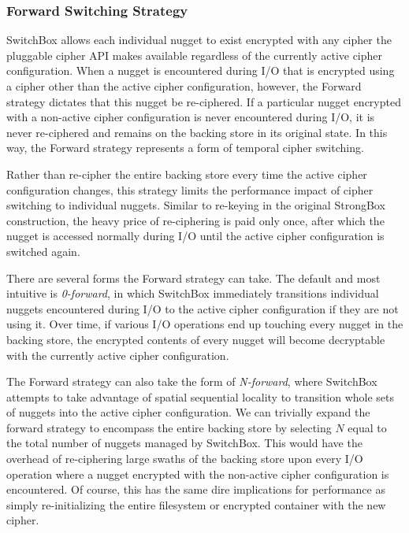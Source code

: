 \subsubsection{Forward Switching Strategy}

SwitchBox allows each individual nugget to exist encrypted with any cipher the
pluggable cipher API makes available regardless of the currently active cipher
configuration. When a nugget is encountered during I/O that is encrypted using a
cipher other than the active cipher configuration, however, the Forward strategy
dictates that this nugget be re-ciphered. If a particular nugget encrypted with
a non-active cipher configuration is never encountered during I/O, it is never
re-ciphered and remains on the backing store in its original state. In this way,
the Forward strategy represents a form of temporal cipher switching.

Rather than re-cipher the entire backing store every time the active cipher
configuration changes, this strategy limits the performance impact of cipher
switching to individual nuggets. Similar to re-keying in the original StrongBox
construction, the heavy price of re-ciphering is paid only once, after which the
nugget is accessed normally during I/O until the active cipher configuration is
switched again.

There are several forms the Forward strategy can take. The default and most
intuitive is \emph{0-forward}, in which SwitchBox immediately transitions
individual nuggets encountered during I/O to the active cipher configuration if
they are not using it. Over time, if various I/O operations end up touching
every nugget in the backing store, the encrypted contents of every nugget will
become decryptable with the currently active cipher configuration.

The Forward strategy can also take the form of \emph{N-forward}, where SwitchBox
attempts to take advantage of spatial sequential locality to transition whole
sets of nuggets into the active cipher configuration. We can trivially expand
the forward strategy to encompass the entire backing store by selecting $N$
equal to the total number of nuggets managed by SwitchBox. This would have the
overhead of re-ciphering large swaths of the backing store upon every I/O
operation where a nugget encrypted with the non-active cipher configuration is
encountered. Of course, this has the same dire implications for performance as
simply re-initializing the entire filesystem or encrypted container with the new
cipher.

